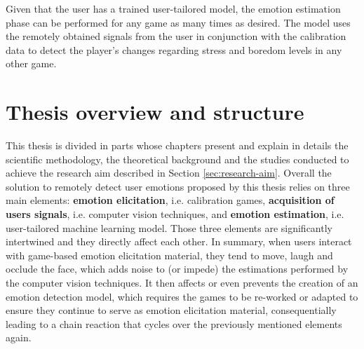 Given that the user has a trained user-tailored model, the emotion estimation phase can be performed for any game as many times as desired. The model uses the remotely obtained signals from the user in conjunction with the calibration data to detect the player's changes regarding stress and boredom levels in any other game.


\section{Thesis overview and structure}

This thesis is divided in parts whose chapters present and explain in details the scientific methodology, the theoretical background and the studies conducted to achieve the research aim described in Section \ref{sec:research-aim}. Overall the solution to remotely detect user emotions proposed by this thesis relies on three main elements: \textbf{emotion elicitation}, i.e. calibration games, \textbf{acquisition of users signals}, i.e. computer vision techniques, and \textbf{emotion estimation}, i.e. user-tailored machine learning model. Those three elements are significantly intertwined and they directly affect each other. In summary, when users interact with game-based emotion elicitation material, they tend to move, laugh and occlude the face, which adds noise to (or impede) the estimations performed by the computer vision techniques. It then affects or even prevents the creation of an emotion detection model, which requires the games to be re-worked or adapted to ensure they continue to serve as emotion elicitation material, consequentially leading to a chain reaction that cycles over the previously mentioned elements again.


